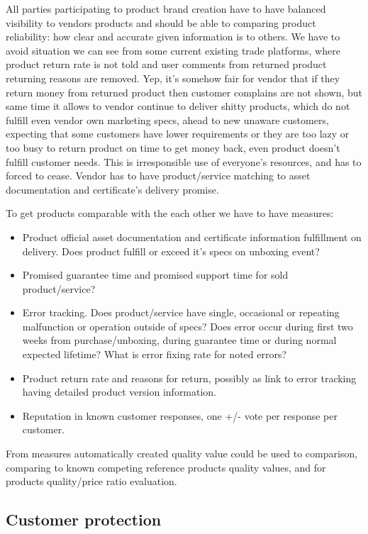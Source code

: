 All parties participating to product brand creation have to have balanced
visibility to vendors products and should be able to comparing product
reliability: how clear and accurate given information is to others. We have to
avoid situation we can see from some current existing trade platforms, where
product return rate is not told and user comments from returned product
returning reasons are removed. Yep, it's somehow fair for vendor that if they
return money from returned product then customer complains are not shown, but
same time it allows to vendor continue to deliver shitty products, which do
not fulfill even vendor own marketing specs, ahead to new unaware customers,
expecting that some customers have lower requirements or they are too lazy or
too busy to return product on time to get money back, even product doesn't
fulfill customer needs. This is irresponsible use of everyone's resources, and
has to forced to cease. Vendor has to have product/service matching to asset
documentation and certificate's delivery promise.

To get products comparable with the each other we have to have measures:
\begin{itemize}
\item Product official asset documentation and certificate information fulfillment on delivery. Does product fulfill or exceed it's specs on unboxing event?
\item Promised guarantee time and promised support time for sold product/service?
\item Error tracking. Does product/service have single, occasional or repeating malfunction or operation outside of specs? Does error occur during first two weeks from purchase/unboxing, during guarantee time or during normal expected lifetime? What is error fixing rate for noted errors?
\item Product return rate and reasons for return, possibly as link to error tracking having detailed product version information.
\item Reputation in known customer responses, one +/- vote per response per customer.
\end{itemize}

From measures automatically created quality value could be used to comparison,
comparing to known competing reference products quality values, and for
products quality/price ratio evaluation.

\subsection{Customer protection}
\label{customer_protection}


